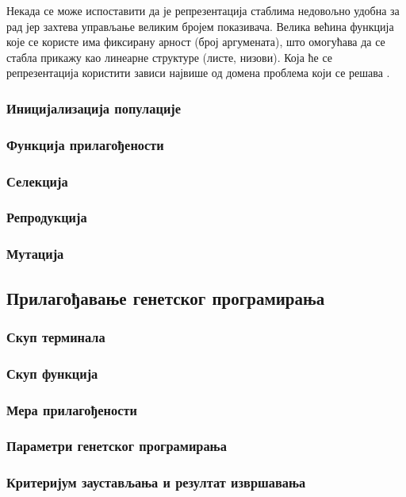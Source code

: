 \documentclass[a4paper]{article}
\begin{document}
Некада се може испоставити да је репрезентација стаблима недовољно удобна за рад јер захтева управљање великим бројем показивача. Велика већина функција које се користе има фиксирану арност (број аргумената), што омогућава да се стабла прикажу као линеарне структуре (листе, низови). Која ће се репрезентација користити зависи највише од домена проблема који се решава \cite{fieldGuidetoGP}.

\subsubsection{Иницијализација популације}
\subsubsection{Функција прилагођености}
\subsubsection{Селекција}
\subsubsection{Репродукција}
\label{sec:reprodukcija}
\subsubsection{Мутација}
\label{sec:mutacija}
\subsection{Прилагођавање генетског програмирања}
\subsubsection{Скуп терминала}
\subsubsection{Скуп функција}
\subsubsection{Мера прилагођености}
\subsubsection{Параметри генетског програмирања}
\subsubsection{Критеријум заустављања и резултат извршавања}
\end{document}
